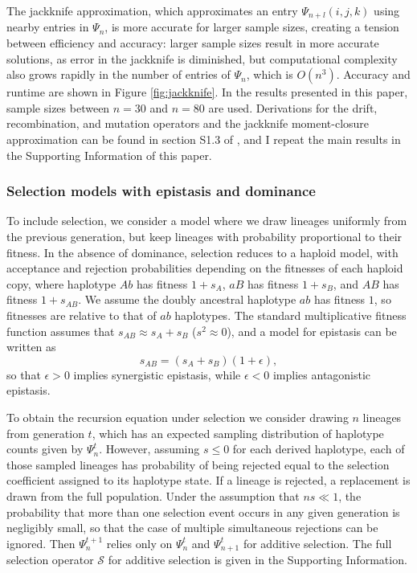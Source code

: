 \documentclass[]{article}
\begin{document}
The jackknife approximation, which approximates an entry \(\Psi_{n+l}(i,j,k)\)
using nearby entries in \(\Psi_n\), is more accurate for larger sample sizes,
creating a tension between efficiency and accuracy: larger sample sizes result
in more accurate solutions, as error in the jackknife is diminished, but
computational complexity also grows rapidly in the number of entries of
\(\Psi_n\), which is \(O(n^3)\). Accuracy and runtime are shown in Figure
\ref{fig:jackknife}. In the results presented in this paper, sample sizes
between \(n=30\) and \(n=80\) are used. Derivations for the drift, recombination,
and mutation operators and the jackknife moment-closure approximation can be
found in section S1.3 of \citet{Ragsdale2019-nt}, and I repeat the main results in the
Supporting Information of this paper.

\subsubsection{Selection models with epistasis and dominance}

To include selection, we consider a model where we draw lineages uniformly from
the previous generation, but keep lineages with probability proportional to
their fitness. In the absence of dominance, selection reduces to a haploid
model, with acceptance and rejection probabilities depending on the fitnesses
of each haploid copy, where haplotype \(Ab\) has fitness \(1 + s_{A}\), \(aB\)
has fitness \(1 + s_{B}\), and \(AB\) has fitness \(1 + s_{AB}\). We assume the
doubly ancestral haplotype \(ab\) has fitness \(1\), so fitnesses are relative
to that of \(ab\) haplotypes. The standard multiplicative fitness function
assumes that \(s_{AB} \approx s_{A} + s_{B}\) (\(s^2\approx0\)), and a model
for epistasis can be written as \[s_{AB} = (s_{A} + s_{B}) (1 + \epsilon),\] so
that \(\epsilon > 0\) implies synergistic epistasis, while \(\epsilon < 0\)
implies antagonistic epistasis.

To obtain the recursion equation under selection we consider drawing \(n\)
lineages from generation \(t\), which has an expected sampling distribution of
haplotype counts given by \(\Psi_n^t\). However, assuming \(s\leq0\) for each
derived haplotype, each of those sampled lineages has probability of being
rejected equal to the selection coefficient assigned to its haplotype state. If
a lineage is rejected, a replacement is drawn from the full population. Under
the assumption that \(ns \ll 1\), the probability that more than one selection
event occurs in any given generation is negligibly small, so that the case of
multiple simultaneous rejections can be ignored. Then \(\Psi_n^{t+1}\) relies
only on \(\Psi_n^t\) and \(\Psi_{n+1}^t\) for additive selection. The full
selection operator \(\mathcal{S}\) for additive selection is given in the
Supporting Information.
\end{document}
